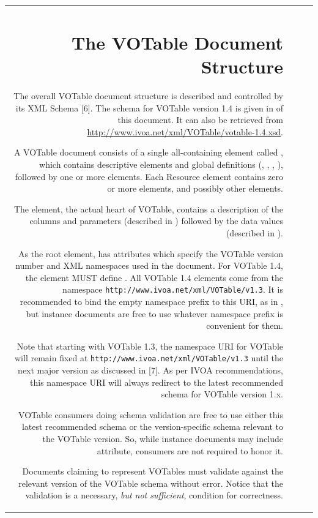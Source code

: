 \begin{tabular}{RRCp{0.8\textwidth}}
\begin{center}
\section{The VOTable Document Structure}
\label{elem:VOTABLE}

The overall VOTable document structure is described and controlled
by its XML Schema [6].  The schema for VOTable version 1.4 is
given in  of this document.  It can also
be retrieved from \url{http://www.ivoa.net/xml/VOTable/votable-1.4.xsd}.

A VOTable document consists of a single all-containing element
called {}, which contains descriptive elements and global definitions
({}, , , ),
followed by one or more {} elements.
Each Resource element contains zero or more  elements,
and possibly other  elements. 

The  element, the actual heart of VOTable, contains 
a description of the columns and parameters 
(described in )
followed by the data values 
(described in ).

As the root element,  has attributes which specify the VOTable version 
number and XML namespaces used in the document. For VOTable 1.4, the 
element MUST define .  All VOTable 1.4 elements come from the 
namespace \nolinkurl{http://www.ivoa.net/xml/VOTable/v1.3}.  It is recommended to bind
the empty namespace prefix to this URI, as in
, but instance
documents are free to use whatever namespace prefix is convenient for them.

Note that starting with VOTable 1.3, the namespace URI for VOTable will
remain fixed at \nolinkurl{http://www.ivoa.net/xml/VOTable/v1.3}
until the next major version as discussed in [7].  As per IVOA
recommendations, this namespace URI will always redirect to the latest
recommended schema for VOTable version 1.x.  

VOTable consumers doing schema validation
are free to use either this latest recommended schema or the version-specific
schema relevant to the VOTable version. So, while instance documents
may include  attribute, consumers are not required
to honor it.  

Documents claiming to represent VOTables must validate against the 
relevant version of the VOTable schema without error.  Notice that the 
validation is a necessary, {\em but not sufficient}, condition for correctness.


\end{center}
\end{tabular}
